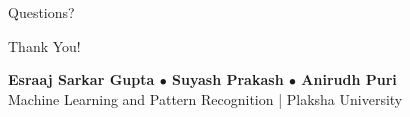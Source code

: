 \documentclass[9pt, aspectratio=169]{beamer}
\begin{document}
\begin{frame}[standout]
    Questions?
    
    \vspace{2em}
    \begin{center}
        \Huge Thank You!
    \end{center}
    \vspace{2em}
    
    \normalsize
    \textbf{Esraaj Sarkar Gupta $\bullet$ Suyash Prakash $\bullet$ Anirudh Puri} \\
    Machine Learning and Pattern Recognition | Plaksha University
\end{frame}
\end{document}
